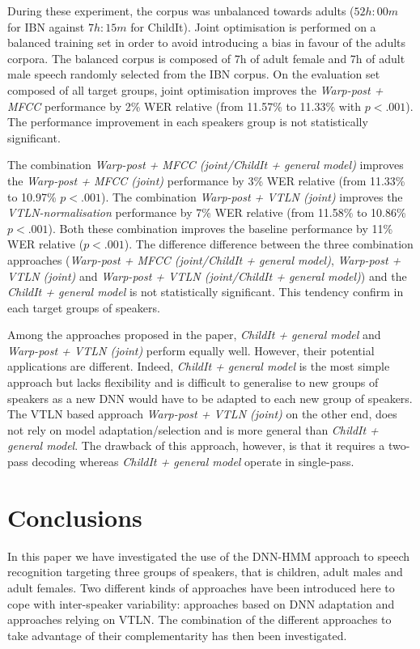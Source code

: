 \documentclass{nle}
\begin{document}
During these experiment, the corpus was unbalanced towards adults ($52h:00m$ for IBN against $7h:15m$ for ChildIt). Joint optimisation is performed on a balanced training set in order to avoid introducing a bias in favour of the adults corpora. The balanced corpus is composed of 7h of adult female and 7h of adult male speech randomly selected from the IBN corpus. On the evaluation set composed of all target groups, joint optimisation improves the {\em Warp-post + MFCC} performance by 2\% WER relative (from 11.57\% to 11.33\% with $p<.001$). The performance improvement in each speakers group is not statistically significant.

The combination {\em Warp-post + MFCC (joint/ChildIt + general model)} improves the {\em Warp-post + MFCC (joint)} performance by 3\% WER relative (from 11.33\% to 10.97\% $p<.001$). The combination {\em Warp-post + VTLN (joint)} improves the {\em VTLN-normalisation} performance by 7\% WER relative (from 11.58\% to 10.86\% $p<.001$). Both these combination improves the baseline performance by 11\% WER relative ($p<.001$). The difference difference between the three combination approaches ({\em Warp-post + MFCC (joint/ChildIt + general model)}, {\em Warp-post + VTLN (joint)} and {\em Warp-post + VTLN (joint/ChildIt + general model)}) and the {\em ChildIt + general model} is not statistically significant. This tendency confirm in each target groups of speakers.

Among the approaches proposed in the paper, {\em ChildIt + general model} and {\em Warp-post + VTLN (joint)} perform equally well. However, their potential applications are different. Indeed, {\em ChildIt + general model} is the most simple approach but lacks flexibility and is difficult to generalise to new groups of speakers as a new DNN would have to be adapted to each new group of speakers. The VTLN based approach {\em Warp-post + VTLN (joint)} on the other end, does not rely on model adaptation/selection and is more general than {\em ChildIt + general model}. The drawback of this approach, however, is that it requires a two-pass decoding whereas {\em ChildIt + general model}  operate in single-pass.


\section{Conclusions}\label{section:concl}
In this paper we have investigated  the use of the DNN-HMM approach to
speech  recognition  targeting  three  groups  of  speakers,  that  is
children,  adult  males and  adult  females.  Two  different kinds  of
approaches   have   been  introduced   here   to  cope  with  inter-speaker
variability: approaches based on DNN adaptation and approaches relying
on VTLN. The combination of the different approaches to take advantage
of their complementarity has then been investigated.
\end{document}
